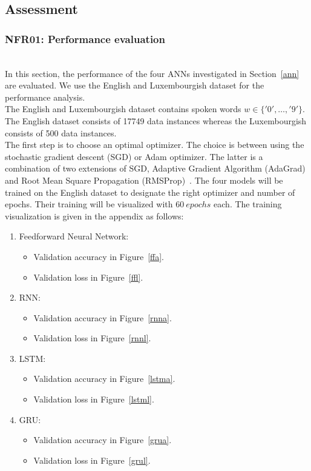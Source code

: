 
\subsection{Assessment}
\subsubsection{NFR01: Performance evaluation}~\label{assessment}~\\

In this section, the performance of the four ANNs investigated in
Section~\ref{ann} are evaluated. We use the English and Luxembourgish dataset
for the performance analysis.\\

The English and Luxembourgish dataset contains spoken words $w \in
\{'0',\dots,'9'\}$. The English dataset consists of 17749 data instances whereas
the Luxembourgish consists of 500 data instances.\\

The first step is to choose an optimal optimizer. The choice is between using
the stochastic gradient descent (SGD) or Adam optimizer. The latter is a
combination of two extensions of SGD, Adaptive Gradient Algorithm (AdaGrad) and
Root Mean Square Propagation (RMSProp)~\cite{Adam}. The four models will be
trained on the English dataset to designate the right optimizer and number of
epochs. Their training will be visualized with $60\ epochs$ each. The training
visualization is given in the appendix as follows:\\

\begin{enumerate}[label=\arabic*.]
  \item Feedforward Neural Network:
    \begin{itemize}
      \item Validation accuracy in Figure~\ref{ffa}.
      \item Validation loss in Figure~\ref{ffl}.
    \end{itemize}
  \item RNN:
    \begin{itemize}
      \item Validation accuracy in Figure~\ref{rnna}.
      \item Validation loss in Figure~\ref{rnnl}.
    \end{itemize}
  \item LSTM:
    \begin{itemize}
      \item Validation accuracy in Figure~\ref{lstma}.
      \item Validation loss in Figure~\ref{lstml}.
    \end{itemize}
  \item GRU:
    \begin{itemize}
      \item Validation accuracy in Figure~\ref{grua}.
      \item Validation loss in Figure~\ref{grul}.
    \end{itemize}
\end{enumerate}~\\

